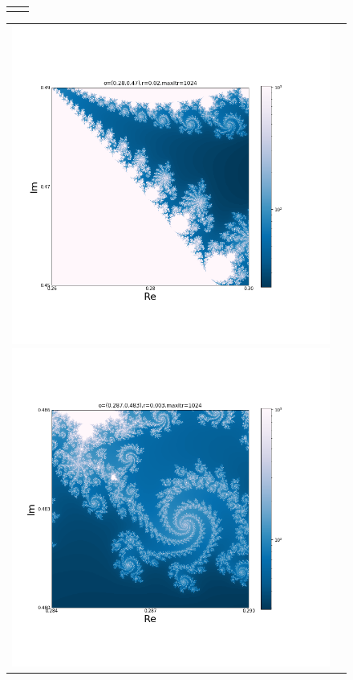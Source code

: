 \documentclass[uplatex,a4paper,11pt,oneside,openany]{jsbook}
\begin{document}
\begin{figure}[H]
\begin{tabular}{cc}
\begin{minipage}{0.5\hsize}
      \end{minipage}
    \end{tabular}
\end{figure}%

\begin{figure}[H]
  \centering
    \begin{tabular}{cc}
      \begin{minipage}{0.5\hsize}
        \centering
  \includegraphics[bb=35 100 650 600,keepaspectratio,clip,scale=0.35]{../src/figure/mandel005.png}
      \end{minipage}
      \begin{minipage}{0.5\hsize}
        \centering
  \includegraphics[bb=35 100 650 600,keepaspectratio,clip,scale=0.35]{../src/figure/mandel006.png}

\end{minipage}
\end{tabular}
\end{figure}
\end{document}
